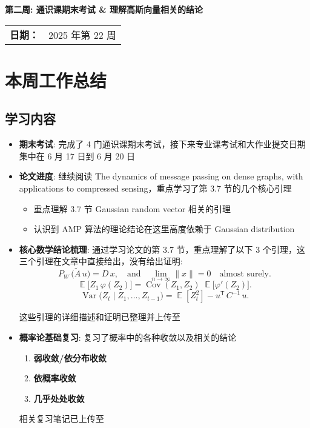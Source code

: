 \documentclass[12pt,a4paper]{article}
\newcommand{\norm}[1]{\|#1\|}
\DeclareMathOperator{\Var}{Var}
\DeclareMathOperator{\Cov}{Cov}
\DeclareMathOperator{\Exp}{\mathbb{E}}
\begin{document}
\begin{center}
    \vspace*{1cm}
        {\Large\bfseries 第二周: 通识课期末考试 \& 理解高斯向量相关的结论}\\[1cm]
    
    \begin{tabular}{ll}
        \textbf{日期：} & 2025 年第 22 周\\[0.3cm]
    \end{tabular}
\end{center}


\section{本周工作总结}

\subsection{学习内容}
\begin{itemize}
    \item \textbf{期末考试}: 完成了 4 门通识课期末考试，接下来专业课考试和大作业提交日期集中在 6 月 17 日到 6 月 20 日
    
    \item \textbf{论文进度}: 继续阅读 The dynamics of message passing on dense graphs, with applications to compressed sensing，重点学习了第 3.7 节的几个核心引理
    \begin{itemize}
        \item 重点理解 3.7 节 Gaussian random vector 相关的引理
        \item 认识到 AMP 算法的理论结论在这里高度依赖于 Gaussian distribution 
    \end{itemize}
    
    \item \textbf{核心数学结论梳理}: 通过学习论文的第 3.7 节，重点理解了以下 3 个引理，这三个引理在文章中直接给出，没有给出证明:
    \[\boxed{
    P_W\,\bigl(\tilde{A}\,u\bigr) = D\,x,
    \quad\text{and}\quad
    \lim_{n\to\infty} \norm{x} = 0 
    \quad\text{almost surely.}}
    \]
    \[\boxed{
    \Exp\bigl[Z_1\,\varphi(Z_2)\bigr]
    =
    \Cov(Z_1,Z_2)\;\Exp\bigl[\varphi'(Z_2)\bigr].}
    \]
    \[\boxed{
    \Var\bigl(Z_t \mid Z_1,\dots,Z_{t-1}\bigr)
    =
    \Exp[Z_t^2]
    -u^{\mathsf{T}}\,C^{-1}\,u.}
    \]
    
    这些引理的详细描述和证明已整理并上传至 
    
    \item \textbf{概率论基础复习}: 复习了概率中的各种收敛以及相关的结论
    \begin{enumerate}
        \item \textbf{弱收敛/依分布收敛}
        \item \textbf{依概率收敛}
        \item \textbf{几乎处处收敛}
    \end{enumerate}
    相关复习笔记已上传至 

\end{itemize}
\end{document}
